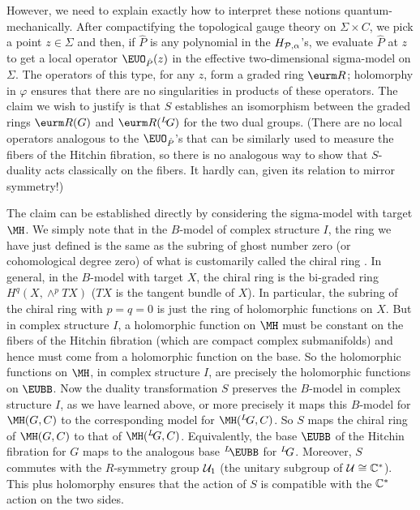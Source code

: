  However, we need to explain exactly how to interpret
these notions quantum-mechanically. After compactifying the
topological gauge theory on $\Sigma\times C$, we pick a point
$z\in \Sigma$ and then, if ${\hat P}$ is any polynomial in the
$H_{{\cal P},\alpha}$'s, we evaluate ${\hat P}$ at $z$ to get a
local operator ${\EUO}_{\hat P}(z)$ in the effective
two-dimensional sigma-model on $\Sigma$. The operators of this
type, for any $z$, form a graded ring ${{\eurm R}}$; holomorphy in
$\varphi$ ensures that there are no singularities in products of
these operators.   The claim we wish to justify is that $S$
establishes an isomorphism between the graded rings ${{\eurm
R}}(G)$ and ${{\eurm R}}(^L\negthinspace G)$ for the two dual
groups. (There are no local operators analogous to the
${\EUO}_{\hat P}$'s that can be similarly used to measure the
fibers of the Hitchin fibration, so there is no analogous way to
show that $S$-duality acts classically on the fibers. It hardly
can, given its relation to mirror symmetry!)

The claim can be established directly by considering the
sigma-model with target $\MH$.  We simply note that in the
$B$-model of complex structure $I$, the ring we have just defined
is the same as the subring of ghost number zero (or cohomological
degree zero) of what is customarily called the chiral ring
\cite{ref78}. In general, in the $B$-model with target $X$, the
chiral ring is the bi-graded ring $H^q(X,\wedge^pTX)$ ($TX$ is the
tangent bundle of $X$). In particular, the subring of the chiral
ring with $p=q=0$  is just the ring of holomorphic functions on
$X$. But in complex structure $I$, a holomorphic function on $\MH$
must be constant on the fibers of the Hitchin fibration (which are
compact complex submanifolds) and hence must come from a
holomorphic function on the base.  So the holomorphic functions on
$\MH$, in complex structure $I$, are precisely the holomorphic
functions on ${\EUBB}$.  Now the duality transformation $S$
preserves the $B$-model in complex structure $I$, as we have
learned above, or more precisely it maps this $B$-model for
$\MH(G,C)$ to the corresponding model for $\MH(^L\negthinspace
G,C)$. So $S$ maps the chiral ring of $\MH(G,C)$ to that of
$\MH(^L\negthinspace G,C)$. Equivalently, the base ${\EUBB}$ of
the Hitchin fibration for $G$ maps to the analogous base
$^L\negthinspace{\EUBB}$ for $^L\negthinspace G$.  Moreover, $S$
commutes with the $R$-symmetry group ${\cal U}_1$ (the unitary
subgroup of ${\cal U}\cong \Bbb{C}^*$).  This plus holomorphy
ensures that the action of $S$ is compatible with the $\Bbb{C}^*$
action on the two sides.

